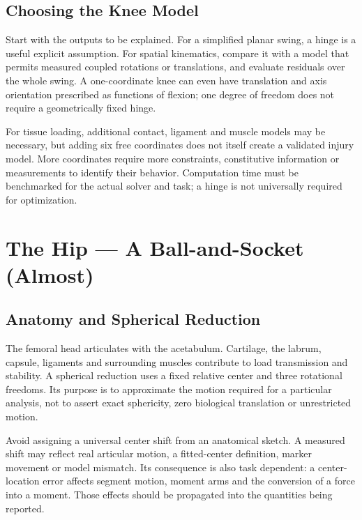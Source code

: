 \subsection{Choosing the Knee Model}\label{choosing-the-knee-model}

Start with the outputs to be explained. For a simplified planar swing, a hinge is a useful explicit assumption. For spatial kinematics, compare it with a model that permits measured coupled rotations or translations, and evaluate residuals over the whole swing. A one-coordinate knee can even have translation and axis orientation prescribed as functions of flexion; one degree of freedom does not require a geometrically fixed hinge.

For tissue loading, additional contact, ligament and muscle models may be necessary, but adding six free coordinates does not itself create a validated injury model. More coordinates require more constraints, constitutive information or measurements to identify their behavior. Computation time must be benchmarked for the actual solver and task; a hinge is not universally required for optimization.

\section{The Hip --- A Ball-and-Socket (Almost)}\label{sec-hip_joint}\label{sec:hip_joint}

\label{the-hip-a-ball-and-socket-almost}{}

\subsection{Anatomy and Spherical Reduction}\label{anatomy-and-spherical-reduction}

The femoral head articulates with the acetabulum. Cartilage, the labrum, capsule, ligaments and surrounding muscles contribute to load transmission and stability. A spherical reduction uses a fixed relative center and three rotational freedoms. Its purpose is to approximate the motion required for a particular analysis, not to assert exact sphericity, zero biological translation or unrestricted motion.

Avoid assigning a universal center shift from an anatomical sketch. A measured shift may reflect real articular motion, a fitted-center definition, marker movement or model mismatch. Its consequence is also task dependent: a center-location error affects segment motion, moment arms and the conversion of a force into a moment. Those effects should be propagated into the quantities being reported.

